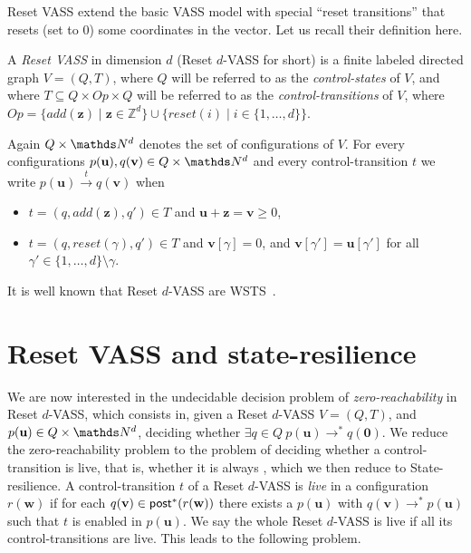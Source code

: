 Reset VASS extend the basic VASS model with special “reset
transitions” that resets (set to $0$) some coordinates in the vector. Let us recall their definition here.
\begin{definition}
A {\em Reset VASS} in dimension $d$ (Reset $d$-VASS for short) is a finite 
labeled directed graph $V = (Q,T)$, where $Q$ will be referred to as the {\em control-states} of $V$, and where 
$T \subseteq Q \times Op \times Q$
 will be referred to as the {\em control-transitions} of $V$,
where $Op = \{ add(\textbf{z}) \mid \textbf{z} \in \mathds{Z}^d\} \cup 
		\{ reset(i) \mid i \in \{1,\ldots,d\} \}$.
\end{definition}

Again $Q \times \N^d$
 denotes the set of configurations of $V$.
For every configurations $p(\textbf{u}), q(\textbf{v}) \in Q \times \N^d$ and every control-transition $t$ we write
$p(\textbf{u}) \xrightarrow{t} q(\textbf{v})$ when 
\begin{samepage}\begin{itemize}
\item  $t = (q,add(\textbf{z}),q') \in T$
and $\textbf{u}+\textbf{z} = \textbf{v} \geq 0$,
\item $t = (q,reset(\gamma),q') \in T$ 
and
$\textbf{v}[\gamma] = 0$, and $\textbf{v}[\gamma'] = \textbf{u}[\gamma']$ for all $\gamma' \in \{1,\ldots, d\} \setminus \gamma$.
\end{itemize} \end{samepage}

It is well known that Reset $d$-VASS are WSTS~\cite{dufourd1998reset}. 


\section{Reset VASS and state-resilience}\label{appendix}

We are now interested in the 
 undecidable \cite{araki1976PN} decision problem of {\em zero-reachability} in Reset $d$-VASS, which consists in, given a
Reset $d$-VASS $V=(Q,T)$, and $p(\textbf{u}) \in Q \times \N^d$,
deciding whether $\exists q \in Q ~ p(\textbf{u}) \to^* q(\textbf{0})$.
%
We reduce the zero-reachability problem to the problem of deciding whether a control-transition is live, that is, whether it is always ,
which we then reduce to {\sc State-resilience}.
A control-transition $t$ of a Reset $d$-VASS is {\em live} in a configuration $r(\textbf{w})$ if for each $q(\textbf{v}) \in \textsf{post}^*(r(\textbf{w}))$ there exists a 
 $p(\textbf{u})$ with $q(\textbf{v}) \to^* p(\textbf{u})$ such that $t$ is enabled in $p(\textbf{u})$. We say the whole Reset $d$-VASS is live if all its control-transitions are
live. This leads to the following problem.

